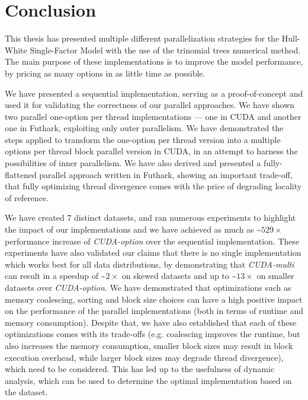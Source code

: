 \chapter{Conclusion}
\label{Conclusion}
This thesis has presented multiple different parallelization strategies for the Hull-White Single-Factor Model with the use of the trinomial trees numerical method. The main purpose of these implementations is to improve the model performance, by pricing as many options in as little time as possible. 

We have presented a sequential implementation, serving as a proof-of-concept and used it for validating the correctness of our parallel approaches. We have shown two parallel one-option per thread implementations --- one in CUDA and another one in Futhark, exploiting only outer parallelism. We have demonstrated the steps applied to transform the one-option per thread version into a multiple options per thread block parallel version in CUDA, in an attempt to harness the possibilities of inner parallelism. We have also derived and presented a fully-flattened parallel approach written in Futhark, showing an important trade-off, that fully optimizing thread divergence comes with the price of degrading locality of reference.

We have created 7 distinct datasets, and ran numerous experiments to highlight the impact of our implementations and we have achieved as much as \textasciitilde$529\times$ performance increase of \textit{CUDA-option} over the sequential implementation. These experiments have also validated our claims that there is no single implementation which works best for all data distributions, by demonstrating that \textit{CUDA-multi} can result in a speedup of \textasciitilde$2\times$ on skewed datasets and up to \textasciitilde$13\times$ on smaller datasets over \textit{CUDA-option}. We have demonstrated that optimizations such as memory coalescing, sorting and block size choices can have a high positive impact on the performance of the parallel implementations (both in terms of runtime and memory consumption). Despite that, we have also established that each of these optimizations comes with its trade-offs (e.g. coalescing improves the runtime, but also increases the memory consumption, smaller block sizes may result in block execution overhead, while larger block sizes may degrade thread divergence), which need to be considered. This has led up to the usefulness of dynamic analysis, which can be used to determine the optimal implementation based on the dataset.

